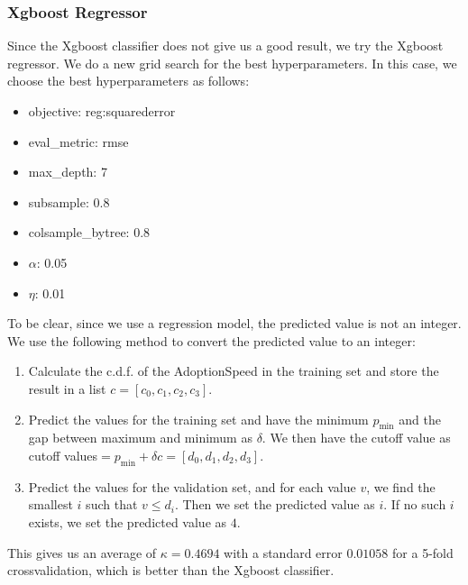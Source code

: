 \subsubsection{Xgboost Regressor}
Since the Xgboost classifier does not give us a good result, we try the Xgboost regressor. We do a new grid search for the best hyperparameters. In this case, we choose the best hyperparameters as follows:
\begin{itemize}
    \item objective: reg:squarederror
    \item eval\_metric: rmse
    \item max\_depth: 7
    \item subsample: 0.8
    \item colsample\_bytree: 0.8
    \item $\alpha$: 0.05
    \item $\eta$: 0.01
\end{itemize}
To be clear, since we use a regression model, the predicted value is not an integer. We use the following method to convert the predicted value to an integer:
\begin{enumerate}
    \item Calculate the c.d.f. of the AdoptionSpeed in the training set and store the result in a list $c=[c_0,c_1,c_2,c_3]$. 
    \item Predict the values for the training set and have the minimum $p_{\min}$ and the gap between maximum and minimum as $\delta$. We then have the cutoff value as cutoff values$=p_{\min}+\delta c=[d_0,d_1,d_2,d_3]$.
    \item Predict the values for the validation set, and for each value $v$, we find the smallest $i$ such that $v\leq d_i$. Then we set the predicted value as $i$. If no such $i$ exists, we set the predicted value as $4$.
\end{enumerate}
This gives us an average of $\kappa=0.4694$ with a standard error $0.01058$ for a 5-fold crossvalidation, which is better than the Xgboost classifier.  

